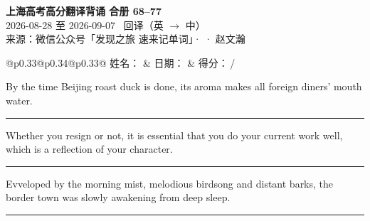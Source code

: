 \documentclass[11pt,a4paper]{article}
\newcommand{\num}[1]{\makebox[1.9em][r]{#1.}\hspace{0.3em}}
\newcommand{\wline}{\noindent\rule{\linewidth}{0.4pt}}
\begin{document}
\pagestyle{plain}
\begin{center}
{\LARGE\bfseries 上海高考高分翻译背诵 \quad 合册 68–77}\\[0.25em]
{\large 2026-08-28 至 2026-09-07 \quad\ 回译（英 $\to$ 中）}\\[0.35em]
{\footnotesize 来源：微信公众号「发现之旅 速来记单词」·  · 赵文瀚}
\end{center}

\vspace{0.4em}
\noindent\begin{tabular}{@{}p{0.33\textwidth}@{}p{0.34\textwidth}@{}p{0.33\textwidth}@{}}
姓名：\underline{\hspace{2.0cm}} & 日期：\underline{\hspace{2.0cm}} & 得分：\underline{\hspace{1.4cm}}\,/ \\
\end{tabular}

\vspace{0.5em}

\vspace{0.8em}
\vspace{0.35em}\vspace{0.15em}

\begin{minipage}{\linewidth}

\num{1}By the time Beijing roast duck is done, its aroma makes all foreign diners’ mouth water.

\vspace{0.25em}

\wline

\end{minipage}

\begin{minipage}{\linewidth}

\num{2}Whether you resign or not, it is essential that you do your current work well, which is a reflection of your character.

\vspace{0.25em}

\wline

\end{minipage}

\begin{minipage}{\linewidth}

\num{3}Evveloped by the morning mist, melodious birdsong and distant barks, the border town was slowly awakening from deep sleep.

\vspace{0.25em}

\wline

\end{minipage}
\end{document}
